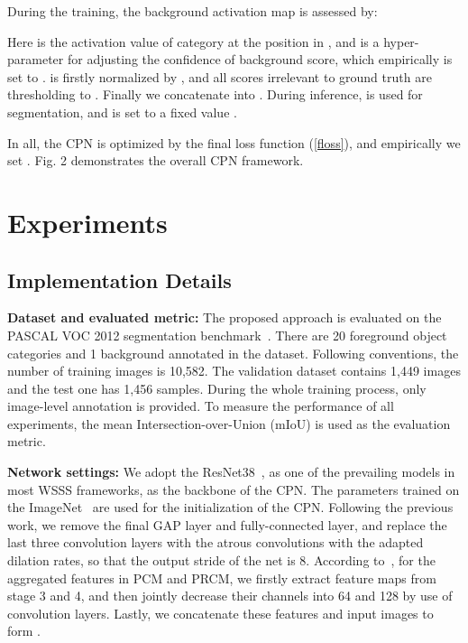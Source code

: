 \documentclass[10pt,twocolumn,letterpaper]{article}
\begin{document}
During the training, the background activation map is assessed by:

Here  is the activation value of category  at the position  in , and  is a hyper-parameter for adjusting the confidence of background score, which empirically is set to .  is firstly normalized by , and all scores irrelevant to ground truth are thresholding to . Finally we concatenate  into . During inference,  is used for segmentation, and  is set to a fixed value .

In all, the CPN is optimized by the final loss function  (\ref{floss}), and empirically we set . Fig. 2 demonstrates the overall CPN framework.

\section{Experiments}
\subsection{Implementation Details}
\noindent\textbf{Dataset and evaluated metric:}\; The proposed approach is evaluated on the PASCAL VOC 2012 segmentation benchmark~\cite{voc12}. There are 20 foreground object categories and 1 background annotated in the dataset. Following conventions, the number of training images is 10,582. The validation dataset contains 1,449 images and the test one has 1,456 samples. During the whole training process, only image-level annotation is provided. To measure the performance of all experiments, the mean Intersection-over-Union (mIoU) is used as the evaluation metric.

\noindent\textbf{Network settings:}\; We adopt the ResNet38~\cite{resnet38}, as one of the prevailing models in most WSSS frameworks, as the backbone of the CPN. The parameters trained on the ImageNet~\cite{imagenet} are used for the initialization of the CPN. Following the previous work, we remove the final GAP layer and fully-connected layer, and replace the last three convolution layers with the atrous convolutions with the adapted dilation rates, so that the output stride of the net is 8. According to~\cite{seam}, for the aggregated features  in PCM and PRCM, we firstly extract feature maps from stage 3 and 4, and then jointly decrease their channels into 64 and 128 by use of  convolution layers. Lastly, we concatenate these features and input images to form .
\end{document}
